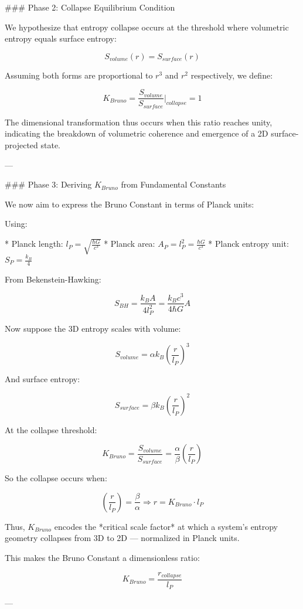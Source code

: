 ### Phase 2: Collapse Equilibrium Condition

We hypothesize that entropy collapse occurs at the threshold where volumetric entropy equals surface entropy:

$$
S_{volume}(r) = S_{surface}(r)
$$

Assuming both forms are proportional to $r^3$ and $r^2$ respectively, we define:

$$
K_{Bruno} = \frac{S_{volume}}{S_{surface}} \Big|_{collapse} = 1
$$

The dimensional transformation thus occurs when this ratio reaches unity, indicating the breakdown of volumetric coherence and emergence of a 2D surface-projected state.

---

### Phase 3: Deriving $K_{Bruno}$ from Fundamental Constants

We now aim to express the Bruno Constant in terms of Planck units:

Using:

* Planck length: $l_P = \sqrt{\frac{\hbar G}{c^3}}$
* Planck area: $A_P = l_P^2 = \frac{\hbar G}{c^3}$
* Planck entropy unit: $S_P = \frac{k_B}{4}$

From Bekenstein-Hawking:

$$
S_{BH} = \frac{k_B A}{4 l_P^2} = \frac{k_B c^3}{4 \hbar G} A
$$

Now suppose the 3D entropy scales with volume:

$$
S_{volume} = \alpha k_B \left(\frac{r}{l_P}\right)^3
$$

And surface entropy:

$$
S_{surface} = \beta k_B \left(\frac{r}{l_P}\right)^2
$$

At the collapse threshold:

$$
K_{Bruno} = \frac{S_{volume}}{S_{surface}} = \frac{\alpha}{\beta} \left(\frac{r}{l_P}\right)
$$

So the collapse occurs when:

$$
\left(\frac{r}{l_P}\right) = \frac{\beta}{\alpha} \Rightarrow r = K_{Bruno} \cdot l_P
$$

Thus, $K_{Bruno}$ encodes the *critical scale factor* at which a system's entropy geometry collapses from 3D to 2D — normalized in Planck units.

This makes the Bruno Constant a dimensionless ratio:

$$
K_{Bruno} = \frac{r_{collapse}}{l_P}
$$

---


